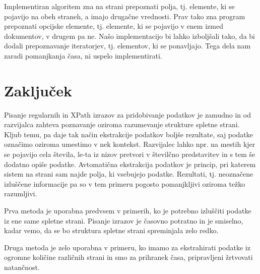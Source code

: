 \documentclass[conference]{IEEEtran}
\begin{document}
	Implementiran algoritem zna na strani prepoznati polja, tj. elemente, ki se pojavijo na obeh straneh, a imajo drugačne vrednosti. Prav tako zna program prepoznati opcijske elemente, tj. elemente, ki se pojavijo v enem izmed dokumentov, v drugem pa ne. Našo implementacijo bi lahko izboljšali tako, da bi dodali prepoznavanje iteratorjev, tj. elementov, ki se ponavljajo. Tega dela nam zaradi pomanjkanja časa, ni uspelo implementirati.
	
%						
	
	\section{Zaključek}
	
	Pisanje regularnih in XPath izrazov za pridobivanje podatkov je zamudno in od razvijalca zahteva poznavanje oziroma razumevanje strukture spletne strani. Kljub temu, pa daje tak način ekstrakcije podatkov boljše rezultate, saj podatke označimo oziroma umestimo v nek kontekst. Razvijalec lahko npr. na mestih kjer se pojavijo cela števila, le-ta iz nizov pretvori v številčno predstavitev in s tem še dodatno opiše podatke. Avtomatična ekstrakcija podatkov je princip, pri katerem sistem na strani sam najde polja, ki vsebujejo podatke. Rezultati, tj. neoznačene izluščene informacije pa so v tem primeru pogosto pomanjkljivi oziroma težko razumljivi.
	
	Prva metoda je uporabna predvsem v primerih, ko je potrebno izluščiti podatke iz ene same spletne strani. Pisanje izrazov je časovno potratno in je smiselno, kadar vemo, da se bo struktura spletne strani spreminjala zelo redko.
	
	Druga metoda je zelo uporabna v primeru, ko imamo za ekstrahirati podatke iz ogromne količine različnih strani in smo za prihranek časa, pripravljeni žrtvovati natančnost.
	
	
	
	
\end{document}
